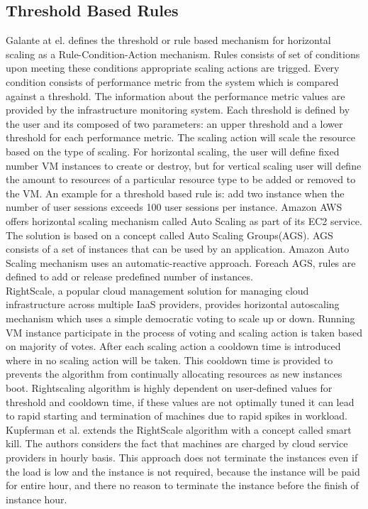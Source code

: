\subsection{Threshold Based Rules}
\label{sub:Threshold Based Rules}
Galante at el.\cite{galante2012survey} defines the threshold or rule based mechanism for horizontal scaling as a Rule-Condition-Action mechanism. Rules consists of set of conditions upon meeting these conditions appropriate scaling actions are trigged. Every condition consists of performance metric from the system which is compared against a threshold. The information about the performance metric values are provided by the infrastructure monitoring system\cite{lorido2012auto}. Each threshold is defined by the user and its composed of two parameters: an upper threshold and a lower threshold for each performance metric\cite{lorido2012auto}. The scaling action will scale the resource based on the  type of scaling. For horizontal scaling, the user will define fixed number VM instances to create or destroy, but for vertical scaling user will define the amount to resources of a particular resource type to be added or removed to the VM. An example for a threshold based rule is: add two instance when the number of user sessions exceeds  100 user sessions per instance\cite{lorido2012auto}.
Amazon AWS offers horizontal scaling mechanism called Auto Scaling as part of its EC2 service\cite{AmazonAutoScale}. The solution is based on a concept called Auto Scaling Groups(AGS)\cite{AmazonAutoScale}. AGS consists of a set of instances that can be used by an application. Amazon Auto Scaling mechanism uses an automatic-reactive approach\cite{galante2012survey}. Foreach AGS, rules are defined to add or release predefined number of instances\cite{AmazonAutoScale}.
\\
RightScale\cite{Rightscale}, a popular cloud management solution for managing cloud infrastructure across multiple IaaS providers, provides horizontal autoscaling mechanism which uses a simple democratic voting to scale up or down\cite{galante2012survey}. Running VM instance participate in the process of voting and scaling action is taken based on majority of votes. After each scaling action a cooldown time is introduced where in no scaling action will be taken\cite{lorido2012auto}. This cooldown time is provided to prevents the algorithm from continually allocating resources as new instances boot\cite{kupferman2009scaling}. Rightscaling algorithm is highly dependent on user-defined values for threshold and cooldown time, if these values are not optimally tuned it can lead to rapid starting and termination of machines due to rapid spikes in workload. Kupferman et al.\cite{kupferman2009scaling} extends the RightScale algorithm with a concept called smart kill. The authors\cite{kupferman2009scaling} considers the fact that machines are charged by cloud service providers in hourly basis. This approach does not terminate the instances even if the load is low and the instance is not required, because the instance will be paid for entire hour, and there no reason to terminate the instance before the finish of instance hour\cite{kupferman2009scaling}.
